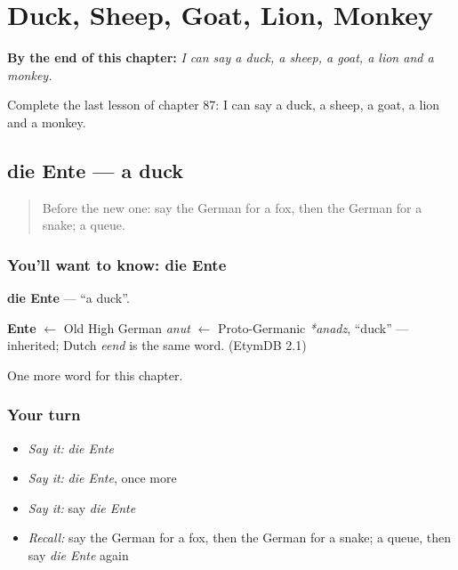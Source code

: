 
\chapter{Duck, Sheep, Goat, Lion, Monkey}
\label{ch:ge-duck-sheep-goat-lion-monkey}

\begin{chapteropening}
\textbf{By the end of this chapter:} \emph{I can say a duck, a sheep, a goat, a lion and a monkey.}

Complete the last lesson of chapter 87: I can say a duck, a sheep, a goat, a lion and a monkey.
\end{chapteropening}

\section[die Ente]{die Ente — a duck}

\label{lesson:GE-C87-ente}



\begin{quote}
Before the new one: say the German for a fox, then the German for a snake; a queue.
\end{quote}

\subsection*{You'll want to know: die Ente}
\textbf{die Ente} — \textquotedblleft{}a duck\textquotedblright{}.

\begin{cousinweb}
\textbf{Ente} $\leftarrow$ Old High German \emph{anut} $\leftarrow$ Proto-Germanic \emph{*anadz}, \textquotedblleft{}duck\textquotedblright{} — inherited; Dutch \emph{eend} is the same word. (EtymDB 2.1)
\end{cousinweb}

\begin{grammarlens}[title={What you've built}]
One more word for this chapter.
\end{grammarlens}

\subsection*{Your turn}
\begin{itemize}
\raggedright
  \item \emph{Say it:} \emph{die Ente}
  \item \emph{Say it:} \emph{die Ente}, once more
  \item \emph{Say it:} say \emph{die Ente}
  \item \emph{Recall:} say the German for a fox, then the German for a snake; a queue, then say \emph{die Ente} again
\end{itemize}

